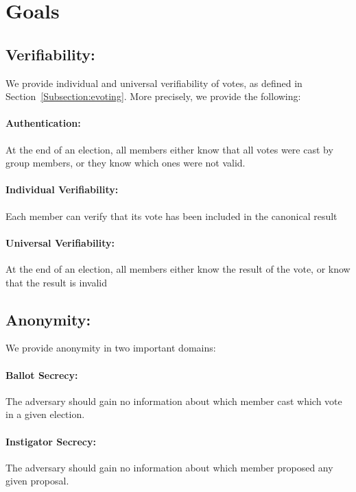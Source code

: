 \section{Goals}
\subsection{Verifiability:}
We provide individual and universal verifiability of votes, as defined in
Section~\ref{Subsection:evoting}. More precisely, we provide the following:
\paragraph{Authentication:} At the end of an election, all members either know
that all votes were cast by group members, or they know which ones were not
valid.
\paragraph{Individual Verifiability:} Each member can verify that its vote has
been included in the canonical result
\paragraph{Universal Verifiability:} At the end of an election, all members
either know the result of the vote, or know that the result is
invalid
\subsection{Anonymity:}
We provide anonymity in two important domains:
\paragraph{Ballot Secrecy:} The adversary should gain no information about which
member cast which vote in a given election.
\paragraph{Instigator Secrecy:} The adversary should gain no information about
which member proposed any given proposal.
